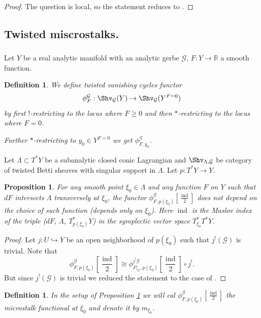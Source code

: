 \documentclass[9pt]{amsart}
\DeclareMathOperator{\ind}{{ind}}
\newcommand{\bR}{{\mathbb R}}
\newcommand{\cG}{{\mathcal G}}
\newtheorem{pr}[subsubsection]{Proposition}
\newtheorem{df}[subsubsection]{Definition}
\numberwithin{equation}{section}
\begin{document}
	\begin{proof}
		The question is local, so the statement reduces to \cite[Theorem 11.3.3]{KS}.
	\end{proof}
	
	\subsection{Twisted miscrostalks.}
	\subsubsection{} Let $Y$ be a real analytic manifold with an analytic gerbe $\cG$, $F: Y \rightarrow \bR$ a smooth function.
	
	\begin{df}
		We define twisted vanishing cycles functor $$\phi^{\cG}_F: \Shv_{\cG}(Y) \rightarrow \Shv_{\cG}(Y^{F=0})$$
		by first $!$-restricting to the locus where $F \geq 0$ and then $*$-restricting to the locus where $F=0$. 
		
		Further $*$-restricting to $y_0 \in Y^{F=0}$ we get $\phi^{\cG}_{F, y_0}$. 
	\end{df}
		Let $\Lambda \subset T^*Y$ be a subanalytic closed conic Lagrangian and $\Shv_{\Lambda, \cG}$ be category of twisted Betti sheaves with singular support in $\Lambda$. Let $p: T^*Y \rightarrow Y$. 
	\begin{pr}\label{microstalk independence}
		For any smooth point $\xi_0 \in \Lambda$ and any function $F$ on $Y$ such that $dF$ intersects $\Lambda$  transversely at $\xi_0$, the functor $\phi^{\cG}_{F, p(\xi_0)}[\frac{\ind}{2}]$ does not depend on the choice of such function (depends only on $\xi_0$). Here $\ind$ is the Maslov index of the triple ($dF$, $\Lambda$, $T^*_{p(\xi_0)}Y$) in the symplectic
		vector space $T_{\xi_0}^* T^*Y$.
	\end{pr} 
	
	\begin{proof}
		Let $j:U \hookrightarrow Y$ be an open neighborhood of $p(\xi_0)$ such that $j^!(\cG)$ is trivial. Note that $$\phi^{\cG}_{F, p(\xi_0)}[\frac{\ind}{2}] \cong \phi^{j^!\cG}_{F|_U, p(\xi_0)}[\frac{\ind}{2}] \circ j^!.$$
		But since $j^!(\cG)$ is trivial we reduced the statement to the case of \cite[Proposition 7.5.3]{KS}. 
	\end{proof}
	
	\begin{df}
		In the setup of Proposition \ref{microstalk independence} we will cal $\phi^{\cG}_{F, p(\xi_0)}[\frac{\ind}{2}]$ the microstalk functional at $\xi_0$ and denote it by $m_{\xi_0}$.
	\end{df}
	
\end{document}
